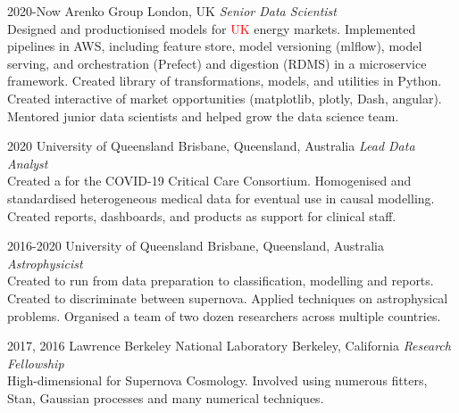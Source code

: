 \documentclass[]{friggeri-cv2}
\begin{document}
\begin{entrylist}

\entry
{2020-Now}
{Arenko Group}
{London, UK}
{\emph{Senior Data Scientist} \\
Designed and productionised  models for \textcolor{red}{UK} energy markets.
Implemented  pipelines in AWS, including feature store, model versioning (mlflow), model serving, 
 and orchestration (Prefect) and digestion (RDMS) in a microservice framework.
Created library of transformations, models, and utilities in Python.
Created interactive  of market opportunities (matplotlib, plotly, Dash, angular).
Mentored junior data scientists and helped grow the data science team.}

\entry
{2020}
{University of Queensland}
{Brisbane, Queensland, Australia}
{\emph{Lead Data Analyst} \\
Created a  for the COVID-19 Critical Care Consortium. 
Homogenised and standardised heterogeneous medical data for eventual use in causal modelling. 
Created reports, dashboards, and products as support for clinical staff.}

\entry
{2016-2020}
{University of Queensland}
{Brisbane, Queensland, Australia}
{\emph{Astrophysicist} \\
Created  to run from data preparation to classification, modelling and reports. 
Created  to discriminate between supernova. 
Applied  techniques on astrophysical problems.
Organised a team of two dozen researchers across multiple countries.}


\entry
{2017, 2016}
{Lawrence Berkeley National Laboratory}
{Berkeley, California}
{\emph{Research Fellowship} \\
High-dimensional  for Supernova Cosmology. 
Involved using numerous  fitters, Stan, Gaussian processes and many numerical techniques.}




\end{entrylist}
\end{document}
